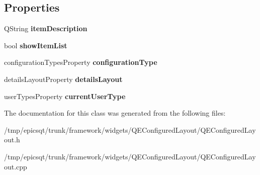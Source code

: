 \subsection*{Properties}
\begin{DoxyCompactItemize}
\item 
\hypertarget{classQEConfiguredLayout_ae71484c773228d35add5b515baccf0f8}{
QString {\bfseries itemDescription}}
\label{classQEConfiguredLayout_ae71484c773228d35add5b515baccf0f8}

\item 
\hypertarget{classQEConfiguredLayout_a84c1ed4d6a6b209534f5f026df196fbf}{
bool {\bfseries showItemList}}
\label{classQEConfiguredLayout_a84c1ed4d6a6b209534f5f026df196fbf}

\item 
\hypertarget{classQEConfiguredLayout_a8fd4cb27cc115f87e8cc98b921c10209}{
configurationTypesProperty {\bfseries configurationType}}
\label{classQEConfiguredLayout_a8fd4cb27cc115f87e8cc98b921c10209}

\item 
\hypertarget{classQEConfiguredLayout_a2c0622b0c2aec67431a42045a5cfbdf9}{
detailsLayoutProperty {\bfseries detailsLayout}}
\label{classQEConfiguredLayout_a2c0622b0c2aec67431a42045a5cfbdf9}

\item 
\hypertarget{classQEConfiguredLayout_ad585800857978eb58d076ce4c9d70a2e}{
userTypesProperty {\bfseries currentUserType}}
\label{classQEConfiguredLayout_ad585800857978eb58d076ce4c9d70a2e}

\end{DoxyCompactItemize}


The documentation for this class was generated from the following files:\begin{DoxyCompactItemize}
\item 
/tmp/epicsqt/trunk/framework/widgets/QEConfiguredLayout/QEConfiguredLayout.h\item 
/tmp/epicsqt/trunk/framework/widgets/QEConfiguredLayout/QEConfiguredLayout.cpp\end{DoxyCompactItemize}
